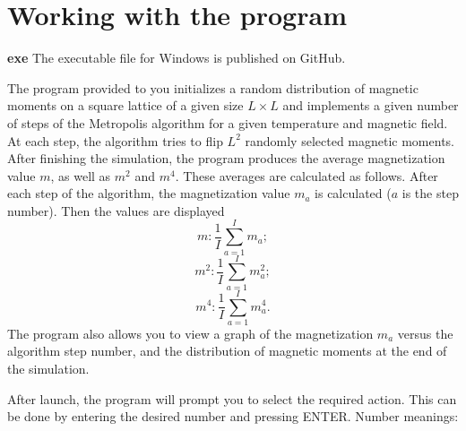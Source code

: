 \documentclass[11pt,a4paper]{article}
\begin{document}
\section*{Working with the program}

\noindent\textbf{exe} The executable file for Windows is published on GitHub.

The program provided to you initializes a random distribution of magnetic moments on a square lattice of a given size $L \times L$ and implements a given number of steps of the Metropolis algorithm for a given temperature and magnetic field. At each step, the algorithm tries to flip $L^2$ randomly selected magnetic moments. After finishing the simulation, the program produces the average magnetization value $m$, as well as $m^2$ and $m^4$. These averages are calculated as follows. After each step of the algorithm, the magnetization value $m_a$ is calculated ($a$ is the step number). Then the values are displayed $$ m : \frac{1}{I}\sum_{a=1}^I m_a; $$ $$ m ^2:  \frac{1}{I}\sum_{a=1}^I m_a^2; $$ $$m^4: \frac{1}{I}\sum_{a=1}^I m_a^4.$$ The program also allows you to view a graph of the magnetization $m_a$ versus the algorithm step number, and the distribution of magnetic moments at the end of the simulation.

After launch, the program will prompt you to select the required action. This can be done by entering the desired number and pressing ENTER. Number meanings:
\end{document}
